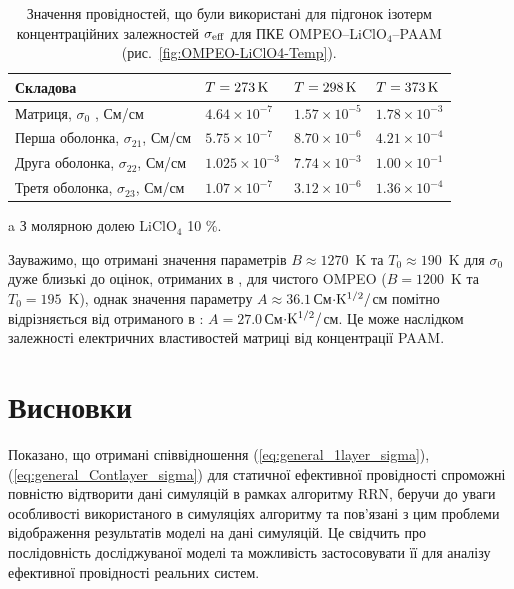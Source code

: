 \documentclass[14pt,twoside]{vakthesis}
\begin{document}
\begin{table}[tb]
	\centering
	\caption{\label{tab:isotherms} Значення провідностей, що були використані для підгонок ізотерм концентраційних залежностей
		$\sigma_{\rm{eff}}$ для ПКЕ OMPEO--LiClO$_4$--PAAM 
		(рис.~\ref{fig:OMPEO-LiClO4-Temp}). }
	\begin{threeparttable}
		\begin{tabularx}{\textwidth}{|X|l|l|l|}
			\hline
			\textrm{Складова}   & $T = 273\,\rm {K}$ & $T = 298\, \rm {K}$ & $T = 373\, \rm {K}$ \\
			\hline
			Матриця, $\sigma_0$ \tnote{a}, См/см          &  $4.64\times 10^{-7}$  &  $1.57\times 10^{-5}$  &  $1.78\times 10^{-3}$   \\
			Перша оболонка, $\sigma_{21}$, См/см   &  $5.75\times 10^{-7}$  &  $8.70\times 10^{-6}$  &  $4.21\times 10^{-4}$    \\
			Друга оболонка, $\sigma_{22}$, См/см  &  $1.025\times 10^{-3}$ &  $7.74\times 10^{-3}$  &  $1.00\times 10^{-1}$   \\
			Третя оболонка, $\sigma_{23}$, См/см   &  $1.07\times 10^{-7}$  &  $3.12\times 10^{-6}$  &  $1.36\times 10^{-4}$ \\
			\hline
		\end{tabularx}
		\begin{tablenotes}
			\item[a] З молярною долею LiClO$_4$ 10 \%. 
		\end{tablenotes}
	\end{threeparttable}
\end{table}

Зауважимо, що отримані значення параметрів $B\approx 1270$~K та $T_0\approx 190$~K для $\sigma_0$ дуже близькі до оцінок, отриманих в \cite{Wiec1994}, для чистого OMPEO ($B = 1200$~K та $T_0 = 195$~K), однак значення параметру $A\approx 36.1\,$См${\rm \cdot K^{1/2}/}$см помітно відрізняється від отриманого в \cite{Wiec1994}: $A=27.0\,$См${\rm \cdot K^{1/2}/}$см. Це може наслідком залежності електричних властивостей матриці від концентрації PAAM.



\section{Висновки}

Показано, що отримані співвідношення (\ref{eq:general_1layer_sigma}), (\ref{eq:general_Contlayer_sigma}) для статичної ефективної провідності спроможні повністю відтворити дані симуляцій в рамках алгоритму RRN, беручи до уваги  особливості  використаного в симуляціях алгоритму та пов'язані з цим проблеми відображення результатів моделі на дані симуляцій. Це свідчить про послідовність досліджуваної моделі та можливість застосовувати її для аналізу ефективної провідності реальних систем.
\end{document}
